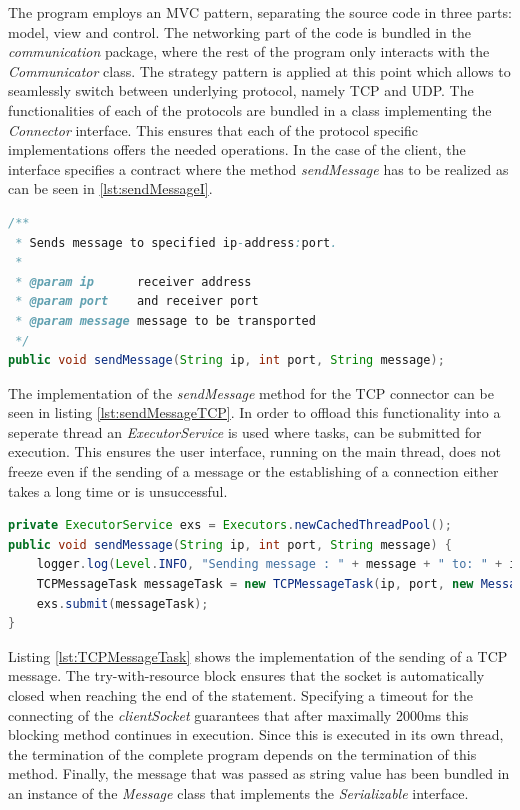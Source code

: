 The program employs an MVC pattern, separating the source code in three parts: model, view and control. The networking part of the code is bundled in the \textit{communication} package, where the rest of the program only interacts with the \textit{Communicator} class. The strategy pattern is applied at this point which allows to seamlessly switch between underlying protocol, namely TCP and UDP. The functionalities of each of the protocols are bundled in a class implementing the \textit{Connector} interface. This ensures that each of the protocol specific implementations offers the needed operations. In the case of the client, the interface specifies a contract where the method \textit{sendMessage} has to be realized as can be seen in \ref{lst:sendMessageI}.

\begin{lstlisting}[language=Java, caption={Interface prescribes a sendMessage method},captionpos=b,label=lst:sendMessageI]
/**
 * Sends message to specified ip-address:port.
 *
 * @param ip      receiver address
 * @param port    and receiver port
 * @param message message to be transported
 */
public void sendMessage(String ip, int port, String message);
\end{lstlisting}

The implementation of the \textit{sendMessage} method for the TCP connector can be seen in listing \ref{lst:sendMessageTCP}. In order to offload this functionality into a seperate thread an \textit{ExecutorService} is used where tasks, can be submitted for execution. This ensures the user interface, running on the main thread, does not freeze even if the sending of a message or the establishing of a connection either takes a long time or is unsuccessful.

\begin{lstlisting}[language=Java, caption={TCP sendMessage implementation},captionpos=b,label=lst:sendMessageTCP]
private ExecutorService exs = Executors.newCachedThreadPool();
public void sendMessage(String ip, int port, String message) {
	logger.log(Level.INFO, "Sending message : " + message + " to: " + ip + ":" + port);
	TCPMessageTask messageTask = new TCPMessageTask(ip, port, new Message(message));
	exs.submit(messageTask);
}
\end{lstlisting}

Listing \ref{lst:TCPMessageTask} shows the implementation of the sending of a TCP message. The try-with-resource block ensures that the socket is automatically closed when reaching the end of the statement. Specifying a timeout for the connecting of the \textit{clientSocket} guarantees that after maximally 2000ms this blocking method continues in execution. Since this is executed in its own thread, the termination of the complete program depends on the termination of this method. Finally, the message that was passed as string value has been bundled in an instance of the \textit{Message} class that implements the \textit{Serializable} interface. 

